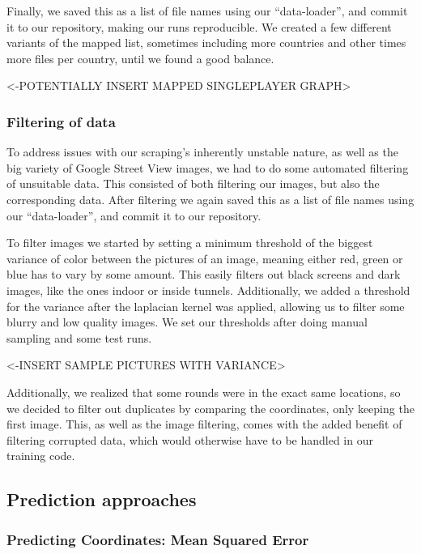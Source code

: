 \documentclass{article}
\begin{document}
Finally, we saved this as a list of file names using our
``data-loader'', and commit it to our repository, making our runs
reproducible. We created a few different variants of the mapped list,
sometimes including more countries and other times more files per
country, until we found a good balance.

\textless-POTENTIALLY INSERT MAPPED SINGLEPLAYER GRAPH\textgreater{}

\subsubsection{Filtering of data}\label{filtering-of-data}

To address issues with our scraping's inherently unstable nature, as
well as the big variety of Google Street View images, we had to do some
automated filtering of unsuitable data. This consisted of both filtering
our images, but also the corresponding data. After filtering we again
saved this as a list of file names using our ``data-loader'', and commit
it to our repository.

To filter images we started by setting a minimum threshold of the
biggest variance of color between the pictures of an image, meaning
either red, green or blue has to vary by some amount. This easily
filters out black screens and dark images, like the ones indoor or
inside tunnels. Additionally, we added a threshold for the variance
after the laplacian kernel was applied, allowing us to filter some
blurry and low quality images. We set our thresholds after doing manual
sampling and some test runs.

\textless-INSERT SAMPLE PICTURES WITH VARIANCE\textgreater{}

Additionally, we realized that some rounds were in the exact same
locations, so we decided to filter out duplicates by comparing the
coordinates, only keeping the first image. This, as well as the image
filtering, comes with the added benefit of filtering corrupted data,
which would otherwise have to be handled in our training code.

\subsection{Prediction approaches}\label{prediction-approaches}

\subsubsection{Predicting Coordinates: Mean Squared
Error}\label{predicting-coordinates-mean-squared-error}
\end{document}
